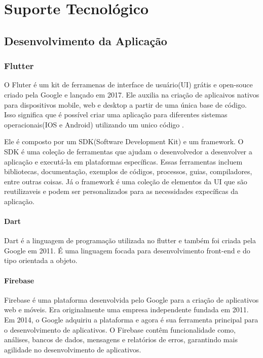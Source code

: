 \chapter[Suporte Tecnológico]{Suporte Tecnológico}
\label{ch:suporte}

\section{Desenvolvimento da Aplicação}

\subsection{Flutter}

O Fluter é um kit de ferramenas de interface de usuário(UI) grátis e open-souce criado pela Google e lançado em 2017. Ele auxilia na criação de aplicaivos nativos para dispositivos mobile, web e desktop a partir de uma única base de código. Isso significa que é possível criar uma aplicação para diferentes sistemas operacionais(IOS e Android) utilizando um unico código \cite{flutter2017}.

Ele é composto por um SDK(Software Development Kit) e um framework. O SDK é uma coleção de ferramentas que ajudam o desenvolvedor a desenvolver a aplicação e executá-la em plataformas específicas. Essas ferramentas incluem bibliotecas, documentação, exemplos de códigos, processos, guias, compiladores, entre outras coisas. Já o framework é uma coleção de elementos da UI que são reutilizaveis e podem ser personalizados para as necessidades expecíficas da aplicação\cite{flutter2017}.

\subsubsection{Dart}

Dart é a linguagem de programação utilizada no flutter e também foi criada pela Google em 2011. É uma linguagem focada para desenvolvimento front-end e do tipo orientada a objeto\cite{flutter2017}.

\subsubsection{Firebase}

Firebase é uma plataforma desenvolvida pelo Google para a criação de aplicativos web e móveis. Era originalmente uma empresa independente fundada em 2011. Em 2014, o Google adquiriu a plataforma e agora é sua ferramenta principal para o desenvolvimento de aplicativos. O Firebase contêm funcionalidade como, análises, bancos de dados, mensagens e relatórios de erros, garantindo mais agilidade no desenvolvimento de aplicativos\cite{firebase2011}.

